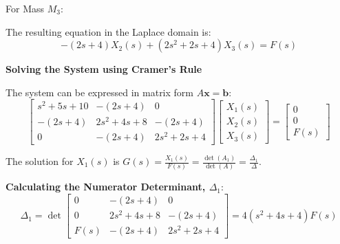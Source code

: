 \documentclass[11pt]{article}
\begin{document}
\vspace{12pt}
{For Mass $M_3$:}
\begin{figure}[h!]
\centering
{}
\end{figure}

The resulting equation in the Laplace domain is:
\begin{equation}
-(2s + 4)X_2(s) + (2s^2 + 2s + 4)X_3(s) = F(s) \tag{3}
\end{equation}

\noindent\textbf{Solving the System using Cramer's Rule}
\vspace{12pt}

The system can be expressed in matrix form $A\mathbf{x} = \mathbf{b}$:
$$
\begin{bmatrix}
s^2 + 5s + 10 & -(2s + 4) & 0 \\
-(2s + 4) & 2s^2 + 4s + 8 & -(2s + 4) \\
0 & -(2s + 4) & 2s^2 + 2s + 4
\end{bmatrix}
\begin{bmatrix}
X_1(s) \\
X_2(s) \\
X_3(s)
\end{bmatrix}
=
\begin{bmatrix}
0 \\
0 \\
F(s)
\end{bmatrix}
$$

The solution for $X_1(s)$ is $G(s) = \frac{X_1(s)}{F(s)} = \frac{\det(A_1)}{\det(A)} = \frac{\Delta_1}{\Delta}$.

\vspace{12pt}
\noindent\textbf{Calculating the Numerator Determinant, $\Delta_1$}:
$$ \Delta_1 = \det
\begin{bmatrix}
0 & -(2s + 4) & 0 \\
0 & 2s^2 + 4s + 8 & -(2s + 4) \\
F(s) & -(2s + 4) & 2s^2 + 2s + 4
\end{bmatrix}
= 4(s^2 + 4s + 4)F(s) $$
\end{document}
